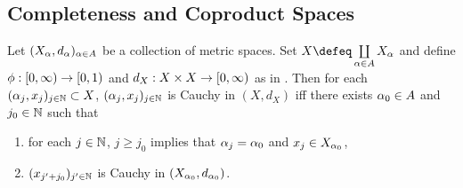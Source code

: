 \documentclass{book}
\begin{document}
\subsection{Completeness and Coproduct Spaces}

\begin{ex} 
	Let $(X_{\alpha}, d_{\alpha})_{\alpha \in A}$ be a collection of metric spaces. Set $X \defeq \coprod\limits_{\al \in A} X_{\al}$ and define $\phi:[0,\infty) \rightarrow [0,1)$ and $d_X: X \times X \rightarrow [0,\infty)$ as in . Then for each $(\alpha_j, x_j)_{j \in \mathbb{N}} \subset X$, $(\alpha_j, x_j)_{j \in \mathbb{N}}$ is Cauchy in $(X, d_X)$ iff there exists $\alpha_0 \in A$ and $j_0 \in \mathbb{N}$ such that 
	\begin{enumerate}
		\item for each $j \in \mathbb{N}$, $j \geq j_0$ implies that $\alpha_j = \alpha_0$ and $x_j \in X_{\alpha_0}$,
		\item $(x_{j'+j_0})_{j' \in \mathbb{N}}$ is Cauchy in $(X_{\alpha_0}, d_{\alpha_0})$. 
	\end{enumerate}
\end{ex}
\end{document}
